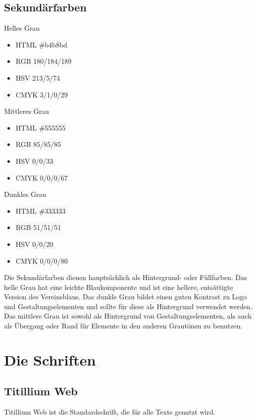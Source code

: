\documentclass{article}
\begin{document}
\subsection{Sekundärfarben}
\begin{samepage}
\cfield[SECLight]
Helles Grau
\begin{itemize}
\item HTML \#b4b8bd
\item RGB 180/184/189
\item HSV 213/5/74
\item CMYK 3/1/0/29
\end{itemize}
\end{samepage}

\begin{samepage}
\cfield[SECMedium]
Mittleres Grau
\begin{itemize}
\item HTML \#555555
\item RGB 85/85/85
\item HSV 0/0/33
\item CMYK 0/0/0/67
\end{itemize}
\end{samepage}

\begin{samepage}
\cfield[SECDark]
Dunkles Grau
\begin{itemize}
\item HTML \#333333
\item RGB 51/51/51
\item HSV 0/0/20
\item CMYK 0/0/0/80
\end{itemize}
\end{samepage}

Die Sekundärfarben dienen hauptsächlich als Hintergrund- oder Füllfarben.
Das helle Grau hat eine leichte Blaukomponente und ist eine hellere, entsättigte Version des Vereinsblaus.
Das dunkle Grau bildet einen guten Kontrast zu Logo und Gestaltungselementen und sollte für diese als Hintergrund verwendet werden.
Das mittlere Grau ist sowohl als Hintergrund von Gestaltungselementen, als auch als Übergang oder Rand für Elemente in den anderen Grautönen zu benutzen.

\cleardoublepage
\section{Die Schriften}

\subsection{Titillium Web}
\begin{samepage}
Titillium Web ist die Standardschrift, die für alle Texte genutzt wird.

\end{samepage}
\end{document}
